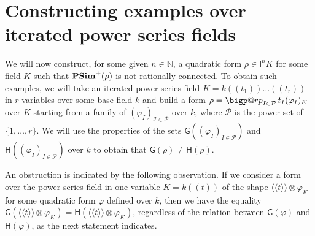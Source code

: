 \documentclass[twoside,11pt]{amsart}
\makeatletter
\numberwithin{equation}{section}
\theoremstyle{definition}
\newcommand{\vf}{\varphi}
\newcommand{\nat}{\mathbb{N}}
\newcommand{\la}{\langle}
\newcommand{\ra}{\rangle}
\newcommand{\lla}{\la\!\la}
\newcommand{\rra}{\ra\!\ra}
\newcommand{\I}{\mathsf{I}}
\newcommand{\mc}{\mathcal}
\newcommand{\G}{\mathsf{G}}
\renewcommand{\H}{\mathsf{H}}
\newcommand{\bigperp}{%
  \mathop{\mathpalette\bigp@rp\relax}%
  \displaylimits
}
\newcommand{\bigp@rp}[2]{%
  \vcenter{
    \m@th\hbox{\scalebox{\ifx#1\displaystyle2.1\else1.5\fi}{$#1\perp$}}
  }%
}
\makeatother
\begin{document}
\section{Constructing examples over iterated power series fields} %
\label{S:construction}


We will now construct, for some given $n\in\nat$, a quadratic form $\rho\in \I^nK$ for some field $K$ such that ${\bf PSim}^+(\rho)$ is not rationally connected. 
To obtain such examples, we will take an iterated power series field $K=k(\!(t_1)\!)\ldots(\!(t_r)\!)$ in $r$ variables over some base field $k$ and build a form 
$\rho=\bigperp_{I\in\mc{P}} t_{I}(\varphi_I)_K$ over $K$ starting from
a family of $(\varphi_{I})_{\mc{I}\in\mc{P}}$ over $k$, where $\mc{P}$ is the power set of $\{1,\dots,r\}$.
We will use the properties of the sets $\G((\varphi_I)_{I\in\mc{P}})$ and $\H((\varphi_I)_{I\in\mc{P}})$ over $k$ to obtain that $\G(\rho)\neq \H(\rho)$.

An obstruction  is indicated by the following observation.
If we consider a form over the power series field in one variable $K=k(\!(t)\!)$ of the shape $\lla t\rra\otimes \vf_K$ for some quadratic form $\vf$ defined over $k$, then we have the equality $\G(\lla t\rra\otimes \vf_K)=\H(\lla t\rra\otimes \vf_K)$, regardless of the relation between $\G(\vf)$ and $\H(\vf)$, as the next statement indicates.
\end{document}
